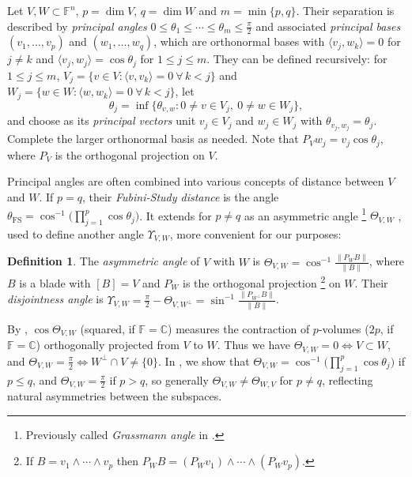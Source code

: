 \documentclass{birkjour}
\theoremstyle{definition}
\newtheorem{definition}[theorem]{Definition}
\def\C			{\mathds{C}}
\def\F			{\mathds{F}}
\newcommand\inner[1] 		{\langle #1 \rangle}		%
\begin{document}
Let $V,W\subset \F^n$, $p=\dim V$, $q=\dim W$ and $m=\min\{p,q\}$.
Their separation is described by \emph{principal angles} \cite{Bjorck1973,Galantai2006} $0 \leq \theta_1\leq\cdots\leq \theta_m \leq \frac\pi2$
and associated \emph{principal bases} $(v_1,\ldots,v_p)$ and $(w_1,\ldots,w_q)$, which are orthonormal bases with $\inner{v_j,w_k} = 0$ for $j \neq k$ and $\inner{v_j,w_j} = \cos \theta_j$ for $1\leq j\leq m$.
They can be defined recursively: 
for $1\leq j\leq m$, 
$V_j = \{v\in V: \inner{v,v_k} = 0 \ \forall\, k<j\}$
and
$W_j = \{w\in W: \inner{w,w_k} = 0 \ \forall\, k<j\}$,
let
\begin{equation}\label{eq:theta_j}
	\theta_j = \inf\{\theta_{v,w} : 0\neq v \in V_j,\  0 \neq w \in W_j\},
\end{equation}
and choose as its \emph{principal vectors} unit $v_j \in V_j$ and $w_j \in W_j$
with $\theta_{v_j,w_j} = \theta_j$.
Complete the larger orthonormal basis as needed.
Note that $P_V w_j = v_j \cos\theta_j$, where $P_V$ is the orthogonal projection on $V$.


Principal angles are often combined into various concepts of distance between $V$ and $W$. 
If $p=q$, their \emph{Fubini-Study distance} is the angle
$\theta_{\mathrm{FS}} = \cos^{-1}\big(\prod_{j=1}^p \cos\theta_j\big)$.
It extends for $p \neq q$ as an asymmetric angle%
\footnote{Previously called \emph{Grassmann angle} in \cite{Mandolesi_Grassmann,Mandolesi_Identities}.}
$\Theta_{V,W}$ \cite{Mandolesi_Products,Mandolesi_TotalGrassmannian},
used to define another angle $\Upsilon_{V,W}$, more convenient for our purposes:

\begin{definition}\label{df:angles}
	The \emph{asymmetric angle} of $V$ with $W$ is $\Theta_{V,W} = \cos^{-1} \frac{\|P_W B\|}{\|B\|}$,
	where $B$ is a blade with $[B]=V$ and $P_W$ is the orthogonal projection%
	\footnote{If $B=v_1\wedge \cdots \wedge v_p$ then $P_W B = (P_W v_1)\wedge \cdots \wedge (P_W v_p)$.}
	on $W$.
	Their \emph{disjointness angle} is $\Upsilon_{V,W}=\frac{\pi}{2}-\Theta_{V,W^\perp}= \sin^{-1} \frac{\|P_{W^\perp} B\|}{\|B\|}$.
\end{definition}

By , $\cos \Theta_{V,W}$ (squared, if $\F=\C$) measures the contraction of $p$-volumes ($2p$, if $\F=\C$) orthogonally projected from $V$ to $W$.
Thus we have $\Theta_{V,W} = 0 \Leftrightarrow V \subset W$, and $\Theta_{V,W} = \frac\pi2 \Leftrightarrow W^\perp \cap V \neq \{0\}$.
In \cite{Mandolesi_Products},
we show that $\Theta_{V,W} = \cos^{-1}\big(\prod_{j=1}^p \cos\theta_j\big)$ if $p \leq q$, and $\Theta_{V,W} = \frac\pi2$ if $p>q$, 
so generally $\Theta_{V,W} \neq \Theta_{W,V}$ for $p \neq q$,
reflecting natural asymmetries between the subspaces.
\end{document}
